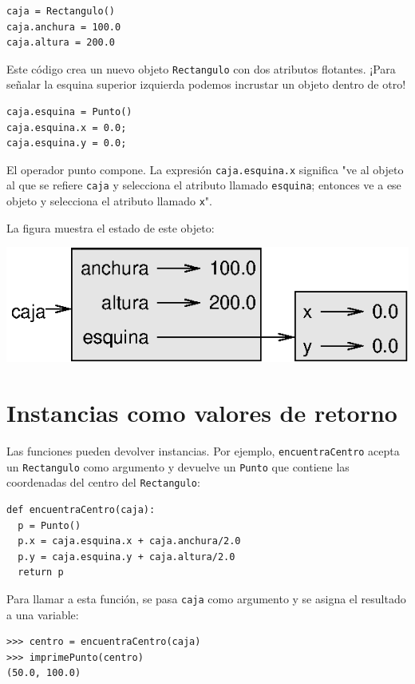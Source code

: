 \beforeverb
\begin{verbatim}
caja = Rectangulo()
caja.anchura = 100.0
caja.altura = 200.0
\end{verbatim}
\afterverb
%
Este código crea un nuevo objeto \texttt{Rectangulo} con dos atributos flotantes.
¡Para señalar la esquina superior izquierda podemos incrustar un objeto dentro de otro!

\beforeverb
\begin{verbatim}
caja.esquina = Punto()
caja.esquina.x = 0.0;
caja.esquina.y = 0.0;
\end{verbatim}
\afterverb
%
El operador punto compone. La expresión \texttt{caja.esquina.x} significa
"ve al objeto al que se refiere \texttt{caja} y selecciona el atributo llamado
\texttt{esquina}; entonces ve a ese objeto y selecciona el atributo llamado
\texttt{x}".

La figura muestra el estado de este objeto:

\beforefig
\centerline{\includegraphics{illustrations/rectangle.eps}}
\afterfig


\section{Instancias como valores de retorno}

Las funciones pueden devolver instancias. Por ejemplo, \texttt{encuentraCentro}
acepta un \texttt{Rectangulo} como argumento y devuelve un \texttt{Punto} que
contiene las coordenadas del centro del \texttt{Rectangulo}:

\beforeverb
\begin{verbatim}
def encuentraCentro(caja):
  p = Punto()
  p.x = caja.esquina.x + caja.anchura/2.0
  p.y = caja.esquina.y + caja.altura/2.0
  return p
\end{verbatim}
\afterverb
%
Para llamar a esta función, se pasa \texttt{caja} como argumento y se asigna el resultado
a una variable:

\beforeverb
\begin{verbatim}
>>> centro = encuentraCentro(caja)
>>> imprimePunto(centro)
(50.0, 100.0)
\end{verbatim}
\afterverb
%

